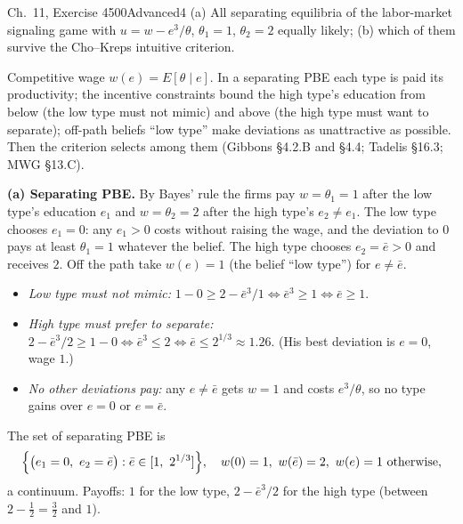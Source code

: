 \begin{exsol}{\MG{} Ch.~11, Exercise 4}{500}{Advanced}{4}
\asked (a) All separating equilibria of the labor-market signaling game with $u = w - e^3/\theta$,
$\theta_1 = 1$, $\theta_2 = 2$ equally likely; (b) which of them survive the Cho--Kreps intuitive criterion.

\method Competitive wage $w(e) = E[\theta \mid e]$. In a separating PBE each type is paid its
productivity; the incentive constraints bound the high type's education from below (the low type must
not mimic) and above (the high type must want to separate); off-path beliefs ``low type'' make
deviations as unattractive as possible. Then the criterion selects among them (Gibbons \S4.2.B and \S4.4;
Tadelis \S16.3; MWG \S13.C).

\solution \textbf{(a) Separating PBE.} By Bayes' rule the firms pay $w = \theta_1 = 1$ after the low
type's education $e_1$ and $w = \theta_2 = 2$ after the high type's $e_2 \ne e_1$. The low type
chooses $e_1 = 0$: any $e_1 > 0$ costs without raising the wage, and the deviation to $0$ pays at least
$\theta_1 = 1$ whatever the belief. The high type chooses $e_2 = \bar e > 0$ and receives $2$.
Off the path take $w(e) = 1$ (the belief ``low type'') for $e \ne \bar e$.
\begin{itemize}
  \item \emph{Low type must not mimic:} $1 - 0 \ge 2 - \bar e^3/1 \iff \bar e^3 \ge 1 \iff \bar e \ge 1$.
  \item \emph{High type must prefer to separate:} $2 - \bar e^3/2 \ge 1 - 0 \iff \bar e^3 \le 2
  \iff \bar e \le 2^{1/3} \approx 1.26$. (His best deviation is $e = 0$, wage $1$.)
  \item \emph{No other deviations pay:} any $e \ne \bar e$ gets $w = 1$ and costs $e^3/\theta$, so no type
  gains over $e = 0$ or $e = \bar e$.
\end{itemize}
The set of separating PBE is
\[
  \Bigl\{\bigl(e_1 = 0,\ e_2 = \bar e\bigr) : \bar e \in [1,\ 2^{1/3}]\Bigr\},
  \quad w(0) = 1,\ w(\bar e) = 2,\ w(e) = 1 \text{ otherwise},
\]
a continuum. Payoffs: $1$ for the low type, $2 - \bar e^3/2$ for the high type (between $2 - \frac12 = \frac32$
and $1$).


\end{exsol}
